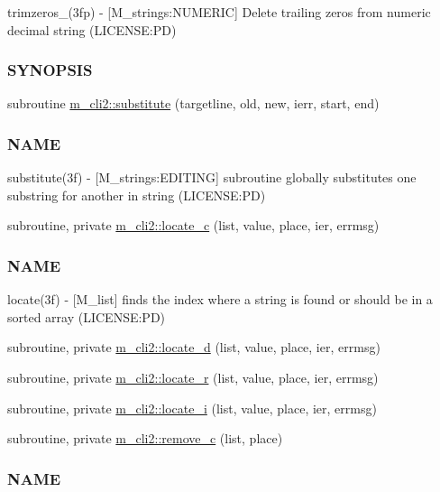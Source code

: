 \begin{DoxyCompactItemize}
\begin{DoxyCompactList}
trimzeros\+\_\+(3fp) -\/ \mbox{[}M\+\_\+strings\+:N\+U\+M\+E\+R\+IC\mbox{]} Delete trailing zeros from numeric decimal string (L\+I\+C\+E\+N\+SE\+:PD) \subsubsection*{S\+Y\+N\+O\+P\+S\+IS}\end{DoxyCompactList}\item 
subroutine \mbox{\hyperlink{namespacem__cli2_a76af7f7c39e6755e024890d85d488704}{m\+\_\+cli2\+::substitute}} (targetline, old, new, ierr, start, end)
\begin{DoxyCompactList}\small\item\em \subsubsection*{N\+A\+ME}

substitute(3f) -\/ \mbox{[}M\+\_\+strings\+:E\+D\+I\+T\+I\+NG\mbox{]} subroutine globally substitutes one substring for another in string (L\+I\+C\+E\+N\+SE\+:PD) \end{DoxyCompactList}\item 
subroutine, private \mbox{\hyperlink{namespacem__cli2_a2199778fea512efcde8778f20765643a}{m\+\_\+cli2\+::locate\+\_\+c}} (list, value, place, ier, errmsg)
\begin{DoxyCompactList}\small\item\em \subsubsection*{N\+A\+ME}

locate(3f) -\/ \mbox{[}M\+\_\+list\mbox{]} finds the index where a string is found or should be in a sorted array (L\+I\+C\+E\+N\+SE\+:PD) \end{DoxyCompactList}\item 
subroutine, private \mbox{\hyperlink{namespacem__cli2_a0e859cd8635ab617ea9a4e9b4ffca852}{m\+\_\+cli2\+::locate\+\_\+d}} (list, value, place, ier, errmsg)
\item 
subroutine, private \mbox{\hyperlink{namespacem__cli2_a2e12eb8c0ae6ce90b821141699e627df}{m\+\_\+cli2\+::locate\+\_\+r}} (list, value, place, ier, errmsg)
\item 
subroutine, private \mbox{\hyperlink{namespacem__cli2_a3cc41a1a629f9ab278376a71b243673d}{m\+\_\+cli2\+::locate\+\_\+i}} (list, value, place, ier, errmsg)
\item 
subroutine, private \mbox{\hyperlink{namespacem__cli2_a155af513c048d68552ec2e8fb54e1294}{m\+\_\+cli2\+::remove\+\_\+c}} (list, place)
\begin{DoxyCompactList}\small\item\em \subsubsection*{N\+A\+ME}


\end{DoxyCompactList}
\end{DoxyCompactItemize}
